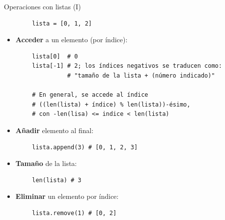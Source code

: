 \documentclass[10pt]{beamer} %
\begin{document}
\begin{frame}[fragile]{Operaciones con listas (I)}
    \begin{verbatim}
        lista = [0, 1, 2]
    \end{verbatim}
    \begin{itemize}
        \item \textbf{Acceder} a un elemento (por índice):
    \end{itemize}
    \begin{verbatim}
        lista[0]  # 0
        lista[-1] # 2; los índices negativos se traducen como:
                  # "tamaño de la lista + (número indicado)"
                  
        # En general, se accede al índice
        # ((len(lista) + índice) % len(lista))-ésimo,
        # con -len(lisa) <= indice < len(lista)
    \end{verbatim}
    \begin{itemize}
        \item \textbf{Añadir} elemento al final:
    \end{itemize}
    \begin{verbatim}
        lista.append(3) # [0, 1, 2, 3]
    \end{verbatim}
    \begin{itemize}
        \item \textbf{Tamaño} de la lista:
    \end{itemize}
    \begin{verbatim}
        len(lista) # 3
    \end{verbatim}
    \begin{itemize}
        \item \textbf{Eliminar} un elemento por índice:
    \end{itemize}
    \begin{verbatim}
        lista.remove(1) # [0, 2]
    \end{verbatim}
\end{frame}
\end{document}
